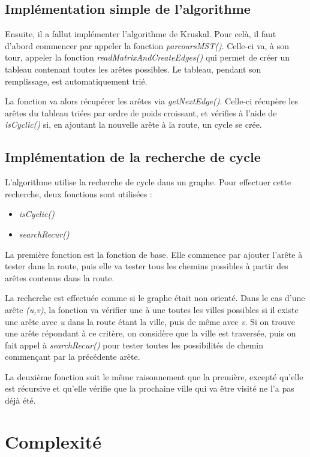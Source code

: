 \subsection{Implémentation simple de l'algorithme}

Ensuite, il a fallut implémenter l'algorithme de Kruskal. Pour celà, il faut d'abord commencer par appeler la fonction \textit{parcoursMST()}. Celle-ci va, à son tour, appeler la fonction \textit{readMatrixAndCreateEdges()} qui permet de créer un tableau contenant toutes les arêtes possibles. Le tableau, pendant son remplissage, est automatiquement trié.

La fonction va alors récupérer les arêtes via \textit{getNextEdge()}. Celle-ci récupère les arêtes du tableau triées par ordre de poids croissant, et vérifies à l'aide de \textit{isCyclic()} si, en ajoutant la nouvelle arête à la route, un cycle se crée.

\subsection{Implémentation de la recherche de cycle}

L'algorithme utilise la recherche de cycle dans un graphe. Pour effectuer cette recherche, deux fonctions sont utilisées :
\begin{itemize}
	\item \textit{isCyclic()}
	\item \textit{searchRecur()}
\end{itemize}

La première fonction est la fonction de base. Elle commence par ajouter l'arête à tester dans la route, puis elle va tester tous les chemins possibles à partir des arêtes contenus dans la route. 

La recherche est effectuée comme si le graphe était non orienté. Dans le cas d'une arête \textit{(u,v)}, la fonction va vérifier une à une toutes les villes possibles si il existe une arête avec \textit{u} dans la route étant la ville, puis de même avec \textit{v}.
Si on trouve une arête répondant à ce critère, on considère que la ville est traversée, puis on fait appel à \textit{searchRecur()} pour tester toutes les possibilités de chemin commençant par la précédente arête.

La deuxième fonction suit le même raisonnement que la première, excepté qu'elle est récursive et qu'elle vérifie que la prochaine ville qui va être visité ne l'a pas déjà été. 

\section{Complexité}

